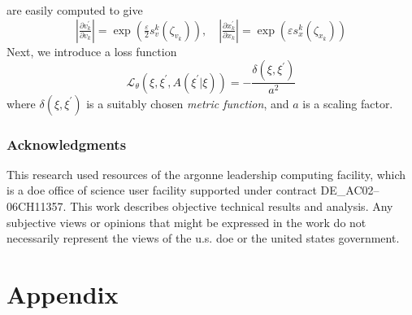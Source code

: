 \documentclass{article} %
\begin{document}
are easily computed to give
%
\begin{equation}
   \left|\tfrac{\partial v^{\prime}_{k}}{\partial v_{k}}\right| 
      = \exp{\left(\tfrac{\varepsilon}{2}s^{k}_{v}(\zeta_{v_{k}})\right)},\quad
   \left|\tfrac{\partial x^{\prime}_{k}}{\partial x_{k}}\right| 
      = \exp{\left(\varepsilon s^{k}_{x}(\zeta_{x_{k}})\right)}
\end{equation}
%
Next, we introduce a loss function
%
\begin{equation}
   \mathcal{L}_{\theta}{\left(\xi, \xi^{\prime}, A(\xi^{\prime}|\xi)\right)} = -\frac{\delta(\xi, \xi^{\prime})}{a^{2}}
\end{equation}
%
where \(\delta(\xi, \xi^{\prime})\) is a suitably chosen \emph{metric function}, and \(a\) is a scaling factor.


\subsubsection*{Acknowledgments}
This research used resources of the argonne leadership computing facility, which is a doe office of science user
facility supported under contract DE\_AC02--06CH11357.%
%
This work describes objective technical results and analysis.
%
Any subjective views or opinions that might be expressed in the work do not necessarily represent the views of the u.s.
doe or the united states government.






\appendix
\section{Appendix}
\end{document}
